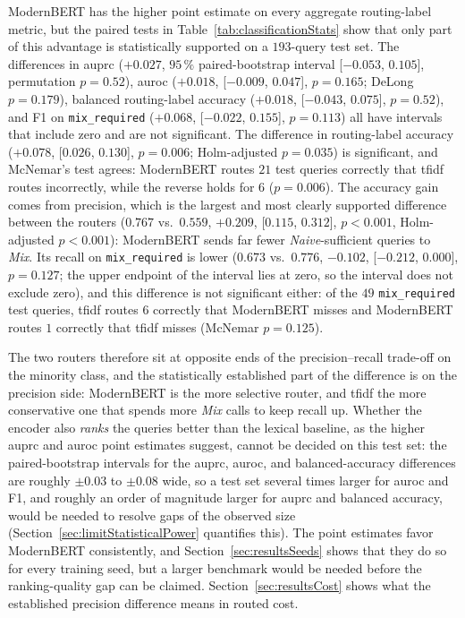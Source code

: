 \documentclass[english, bibtex]{kththesis}               %
\numberwithin{listing}{chapter}
\begin{document}
ModernBERT has the higher point estimate on every aggregate routing-label metric, but the paired tests in Table~\ref{tab:classificationStats} show that only part of this advantage is statistically supported on a $193$-query test set. The differences in \gls{auprc} ($+0.027$, $95\,\%$ paired-bootstrap interval [$-0.053$, $0.105$], permutation $p = 0.52$), \gls{auroc} ($+0.018$, [$-0.009$, $0.047$], $p = 0.165$; DeLong $p = 0.179$), balanced routing-label accuracy ($+0.018$, [$-0.043$, $0.075$], $p = 0.52$), and F1 on \texttt{mix\_required} ($+0.068$, [$-0.022$, $0.155$], $p = 0.113$) all have intervals that include zero and are not significant. The difference in routing-label accuracy ($+0.078$, [$0.026$, $0.130$], $p = 0.006$; Holm-adjusted $p = 0.035$) is significant, and McNemar's test agrees: ModernBERT routes $21$ test queries correctly that \gls{tfidf} routes incorrectly, while the reverse holds for $6$ ($p = 0.006$). The accuracy gain comes from precision, which is the largest and most clearly supported difference between the routers ($0.767$ vs.\ $0.559$, $+0.209$, [$0.115$, $0.312$], $p < 0.001$, Holm-adjusted $p < 0.001$): ModernBERT sends far fewer \emph{Naive}-sufficient queries to \emph{Mix}. Its recall on \texttt{mix\_required} is lower ($0.673$ vs.\ $0.776$, $-0.102$, [$-0.212$, $0.000$], $p = 0.127$; the upper endpoint of the interval lies at zero, so the interval does not exclude zero), and this difference is not significant either: of the $49$ \texttt{mix\_required} test queries, \gls{tfidf} routes $6$ correctly that ModernBERT misses and ModernBERT routes $1$ correctly that \gls{tfidf} misses (McNemar $p = 0.125$).

The two routers therefore sit at opposite ends of the precision--recall trade-off on the minority class, and the statistically established part of the difference is on the precision side: ModernBERT is the more selective router, and \gls{tfidf} the more conservative one that spends more \emph{Mix} calls to keep recall up. Whether the encoder also \emph{ranks} the queries better than the lexical baseline, as the higher \gls{auprc} and \gls{auroc} point estimates suggest, cannot be decided on this test set: the paired-bootstrap intervals for the \gls{auprc}, \gls{auroc}, and balanced-accuracy differences are roughly $\pm 0.03$ to $\pm 0.08$ wide, so a test set several times larger for \gls{auroc} and F1, and roughly an order of magnitude larger for \gls{auprc} and balanced accuracy, would be needed to resolve gaps of the observed size (Section~\ref{sec:limitStatisticalPower} quantifies this). The point estimates favor ModernBERT consistently, and Section~\ref{sec:resultsSeeds} shows that they do so for every training seed, but a larger benchmark would be needed before the ranking-quality gap can be claimed. Section~\ref{sec:resultsCost} shows what the established precision difference means in routed cost.
\end{document}

